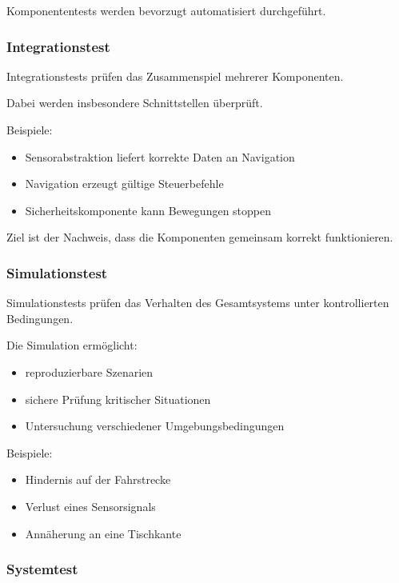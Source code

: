 Komponententests werden bevorzugt automatisiert durchgeführt.

\subsubsection{Integrationstest}\label{integrationstest}

Integrationstests prüfen das Zusammenspiel mehrerer Komponenten.

Dabei werden insbesondere Schnittstellen überprüft.

Beispiele:

\begin{itemize}
\tightlist
\item
  Sensorabstraktion liefert korrekte Daten an Navigation
\item
  Navigation erzeugt gültige Steuerbefehle
\item
  Sicherheitskomponente kann Bewegungen stoppen
\end{itemize}

Ziel ist der Nachweis, dass die Komponenten gemeinsam korrekt
funktionieren.

\subsubsection{Simulationstest}\label{simulationstest}

Simulationstests prüfen das Verhalten des Gesamtsystems unter
kontrollierten Bedingungen.

Die Simulation ermöglicht:

\begin{itemize}
\tightlist
\item
  reproduzierbare Szenarien
\item
  sichere Prüfung kritischer Situationen
\item
  Untersuchung verschiedener Umgebungsbedingungen
\end{itemize}

Beispiele:

\begin{itemize}
\tightlist
\item
  Hindernis auf der Fahrstrecke
\item
  Verlust eines Sensorsignals
\item
  Annäherung an eine Tischkante
\end{itemize}

\subsubsection{Systemtest}\label{systemtest}

